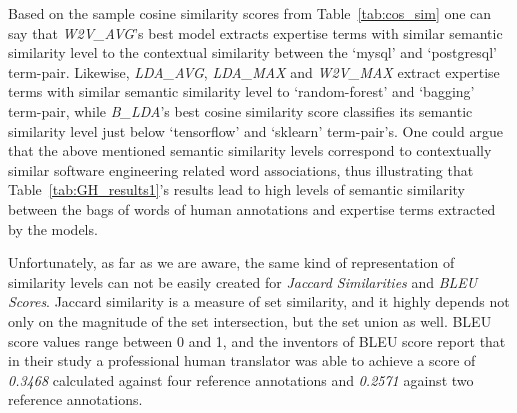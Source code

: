             \begin{table}
                  \centering
                  \caption{Example of Cosine Similarity Scores between Term-Pairs.} \label{tab:cos_sim}
                  \vspace{6pt} %
            \end{table}
            
            Based on the sample cosine similarity scores from Table~\ref{tab:cos_sim} one can say that \emph{W2V\_AVG}'s best model extracts expertise terms with similar semantic similarity level to the contextual similarity between the `mysql' and `postgresql' term-pair. Likewise, \emph{LDA\_AVG}, \emph{LDA\_MAX} and \emph{W2V\_MAX} extract expertise terms with similar semantic similarity level to `random-forest' and `bagging' term-pair, while \emph{B\_LDA}'s best cosine similarity score classifies its semantic similarity level just below `tensorflow' and `sklearn' term-pair's. One could argue that the above mentioned semantic similarity levels correspond to contextually similar software engineering related word associations, thus illustrating that Table~\ref{tab:GH_results1}'s results lead to high levels of semantic similarity between the bags of words of human annotations and expertise terms extracted by the models.
            
            Unfortunately, as far as we are aware, the same kind of representation of similarity levels can not be easily created for \emph{Jaccard Similarities} and \emph{BLEU Scores}. Jaccard similarity is a measure of set similarity, and it highly depends not only on the magnitude of the set intersection, but the set union as well. BLEU score values range between 0 and 1, and the inventors of BLEU score report that in their study a professional human translator was able to achieve a score of \emph{0.3468} calculated against four reference annotations and \emph{0.2571} against two reference annotations\cite{papineni2002bleu}.
        
